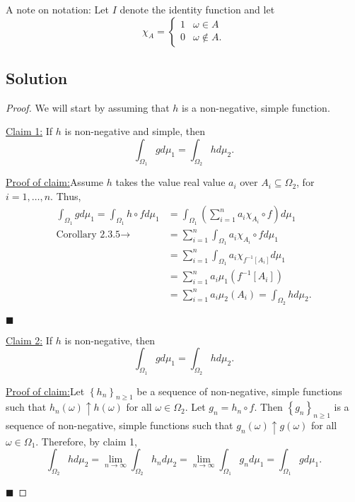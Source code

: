 \documentclass[12pt]{article}
\newenvironment{claimproof}[1]{\par\noindent\underline{Proof of claim:}\space#1}{\hfill $\blacksquare$\vspace{3mm}}
\begin{document}
A note on notation: Let $I$ denote the identity function and let 
\[ \chi_{A} = \left\{ \begin{array}{cl}
1 & \omega \in A \\
0 & \omega \notin A.
\end{array}\right. \]

\subsection*{Solution}
\begin{proof} 
We will start by assuming that $h$ is a non-negative, simple function.

\underline{Claim 1:} If $h$ is non-negative and simple, then 
\[ \int_{\Omega_{1}}gd\mu_{1} = \int_{\Omega_{2}}hd\mu_{2}. \]
\begin{claimproof}
Assume $h$ takes the value real value $a_{i}$ over $A_{i} \subseteq \Omega_{2}$, for $i = 1,\hdots, n$. Thus,
\begin{align*}
\int_{\Omega_{1}}gd\mu_{1} = \int_{\Omega_{1}}h\circ fd\mu_{1} & = \int_{\Omega_{1}}\left( \sum_{i=1}^{n}a_{i}\chi_{A_{i}}\circ f \right)d\mu_{1} \\
\text{Corollary 2.3.5} \rightarrow \qquad & = \sum_{i=1}^{n}\int_{\Omega_{1}}a_{i}\chi_{A_{i}}\circ f d\mu_{1} \\
& = \sum_{i=1}^{n}\int_{\Omega_{1}}a_{i}\chi_{f^{-1}[A_{i}]}d\mu_{1} \\
& = \sum_{i=1}^{n}a_{i}\mu_{1}\left( f^{-1}[A_{i}] \right) \\
& = \sum_{i=1}^{n}a_{i}\mu_{2}\left( A_{i} \right) = \int_{\Omega_{2}}hd\mu_{2}.
\end{align*}

\vspace{-10mm}
\end{claimproof}

\underline{Claim 2:} If $h$ is non-negative, then 
\[ \int_{\Omega_{1}}gd\mu_{1} = \int_{\Omega_{2}}hd\mu_{2}. \]
\begin{claimproof}
Let $\left\{ h_{n} \right\}_{n\geq 1}$ be a sequence of non-negative, simple functions such that $h_{n}(\omega)\uparrow h(\omega)$ for all $\omega \in
\Omega_{2}$. Let $g_{n} = h_{n} \circ f$. Then $\left\{ g_{n} \right\}_{n\geq 1}$ is a sequence of non-negative, simple functions such that
$g_{n}(\omega) \uparrow g(\omega)$ for all $\omega \in \Omega_{1}$. Therefore, by claim 1,
\[ \int_{\Omega_{2}}hd\mu_{2} = \lim_{n\rightarrow\infty}\int_{\Omega_{2}}h_{n}d\mu_{2} = \lim_{n\rightarrow\infty}\int_{\Omega_{1}}g_{n}d\mu_{1} =
\int_{\Omega_{1}}gd\mu_{1}. \]


\end{claimproof}
\end{proof}
\end{document}
